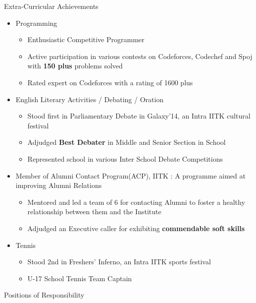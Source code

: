 \documentclass{article}
\begin{document}
\vspace{10pt}
{\Large Extra-Curricular Achievements}
\begin{itemize}
\item Programming
	\begin{itemize}
	\item Enthusiastic Competitive Programmer
	\item Active participation in various contests on Codeforces, Codechef and Spoj with \textbf{150 plus} problems solved
	\item Rated expert on Codeforces with a rating of 1600 plus
	\end{itemize}
\item English Literary Activities / Debating / Oration
	\begin{itemize}
	\item Stood first in Parliamentary Debate in Galaxy'14, an Intra IITK cultural festival 
	\item Adjudged \textbf{Best Debater} in Middle and Senior Section in School
	\item Represented school in various Inter School Debate Competitions
	\end{itemize}
\item Member of Alumni Contact Program(ACP), IITK : A programme aimed at improving Alumni Relations
	\begin{itemize}
	\item Mentored and led a team of 6 for contacting Alumni to foster a healthy relationship between them and the Institute
	\item Adjudged an Executive caller for exhibiting \textbf{commendable soft skills}
	\end{itemize}
	\item Tennis
	\begin{itemize}
	\item Stood 2nd in Freshers' Inferno, an Intra IITK sports festival 
	\item U-17 School Tennis Team Captain
	\end{itemize}

\end{itemize}
\vspace{10pt}
{\Large Positions of Responsibility}
\end{document}
